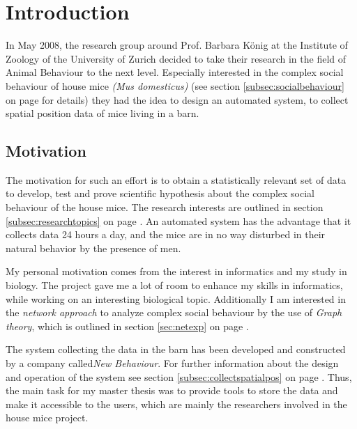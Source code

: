\newpage

\section{Introduction}
\label{sec:introduction}

In May 2008, the research group around Prof. Barbara K\"onig at the Institute of Zoology of the University of Zurich decided to take their research in the field of Animal Behaviour to the next level. Especially interested in the complex social behaviour of house mice \textit{(Mus domesticus)} (see section \ref{subsec:socialbehaviour} on page \pageref{subsec:socialbehaviour} for details) they had the idea to design an automated system, to collect spatial position data of mice living in a barn.

\subsection{Motivation}
\label{subsec:motivation}
The motivation for such an effort is to obtain a statistically relevant set of data to develop, test and prove scientific hypothesis about the complex social behaviour of the house mice. The research interests are outlined in section \ref{subsec:researchtopics} on page \pageref{subsec:researchtopics}. An automated system has the advantage that it collects data 24 hours a day, and the mice are in no way disturbed in their natural behavior by the presence of men.

My personal motivation comes from the interest in informatics and my study in biology. The project gave me a lot of room to enhance my skills in informatics, while working on an interesting biological topic. Additionally I am interested in the \textit{network approach} to analyze complex social behaviour by the use of \textit{Graph theory}\cite{wiki:graph_theory}, which is outlined in section \ref{sec:netexp} on page \pageref{sec:netexp}.

The system collecting the data in the barn has been developed and constructed by a company called\textit{New Behaviour}. For further information about the design and operation of the system see section \ref{subsec:collectspatialpos} on page \pageref{subsec:collectspatialpos}. Thus, the main task for my master thesis was to provide tools to store the data and make it accessible to the users, which are mainly the researchers involved in the house mice project. 

